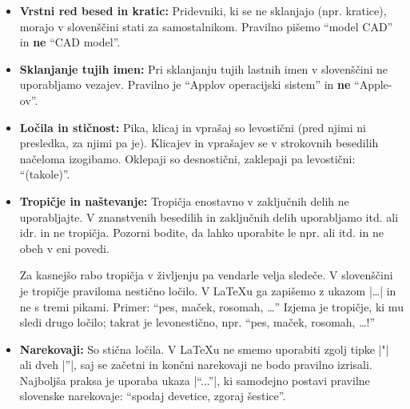 \documentclass[9pt]{style/friteza}
\begin{document}
\begin{itemize}
    \item \textbf{Vrstni red besed in kratic:} Pridevniki, ki se ne sklanjajo (npr. kratice), morajo v slovenščini stati za samostalnikom. Pravilno pišemo \enquote{model CAD} in \textbf{ne} \enquote{CAD model}.
    
    \item \textbf{Sklanjanje tujih imen:} Pri sklanjanju tujih lastnih imen v slovenščini ne uporabljamo vezajev. Pravilno je \enquote{Applov operacijski sistem} in \textbf{ne} \enquote{Apple-ov}.
    
    \item \textbf{Ločila in stičnost:} Pika, klicaj in vprašaj so levostični (pred njimi ni presledka, za njimi pa je). Klicajev in vprašajev se v strokovnih besedilih načeloma izogibamo. Oklepaji so desnostični, zaklepaji pa levostični: \enquote{(takole)}.
    
    \item \textbf{Tropičje in naštevanje:} Tropičja enostavno v zaključnih delih ne uporabljajte. V znanstvenih besedilih in zaključnih delih uporabljamo itd. ali idr. in ne tropičja. Pozorni bodite, da lahko uporabite le npr. ali itd. in ne obeh v eni povedi.
    
    Za kasnejšo rabo tropičja v življenju pa vendarle velja sledeče. V slovenščini je tropičje praviloma nestično ločilo. V \LaTeX u ga zapišemo z ukazom \ltx|\dots| in ne s tremi pikami. Primer: \enquote{pes, maček, rosomah, \dots} Izjema je tropičje, ki mu sledi drugo ločilo; takrat je levonestično, npr. \enquote{pes, maček, rosomah, \dots!}
    
    \item \textbf{Narekovaji:} So stična ločila. V \LaTeX{u} ne smemo uporabiti zgolj tipke \ltx|"| ali dveh \ltx|''|, saj se začetni in končni narekovaji ne bodo pravilno izrisali. Najboljša praksa je uporaba ukaza \ltx|\enquote{...}|, ki samodejno postavi pravilne slovenske narekovaje: \enquote{spodaj devetice, zgoraj šestice}.
    

\end{itemize}
\end{document}
